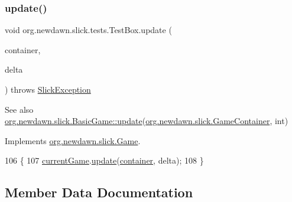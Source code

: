 \subsubsection{\texorpdfstring{update()}{update()}}
{\footnotesize\ttfamily void org.\+newdawn.\+slick.\+tests.\+Test\+Box.\+update (\begin{DoxyParamCaption}\item[{\mbox{\hyperlink{classorg_1_1newdawn_1_1slick_1_1_game_container}{Game\+Container}}}]{container,  }\item[{int}]{delta }\end{DoxyParamCaption}) throws \mbox{\hyperlink{classorg_1_1newdawn_1_1slick_1_1_slick_exception}{Slick\+Exception}}\hspace{0.3cm}{\ttfamily [inline]}}

\begin{DoxySeeAlso}{See also}
\mbox{\hyperlink{classorg_1_1newdawn_1_1slick_1_1_basic_game_acfe6fa05aef83bff1631af91a3e4bd20}{org.\+newdawn.\+slick.\+Basic\+Game\+::update}}(\mbox{\hyperlink{classorg_1_1newdawn_1_1slick_1_1_game_container}{org.\+newdawn.\+slick.\+Game\+Container}}, int) 
\end{DoxySeeAlso}


Implements \mbox{\hyperlink{interfaceorg_1_1newdawn_1_1slick_1_1_game_ab07b2e9463ee4631620dde0de25bdee8}{org.\+newdawn.\+slick.\+Game}}.


\begin{DoxyCode}
106                                                                                  \{
107         \mbox{\hyperlink{classorg_1_1newdawn_1_1slick_1_1tests_1_1_test_box_a5e0fdb2f97173d828af597044c525078}{currentGame}}.\mbox{\hyperlink{classorg_1_1newdawn_1_1slick_1_1_basic_game_acfe6fa05aef83bff1631af91a3e4bd20}{update}}(\mbox{\hyperlink{classorg_1_1newdawn_1_1slick_1_1tests_1_1_test_box_a686d64440b8b2323907a6c4641669c60}{container}}, delta);
108     \}
\end{DoxyCode}


\subsection{Member Data Documentation}
\mbox{\label{classorg_1_1newdawn_1_1slick_1_1tests_1_1_test_box_a686d64440b8b2323907a6c4641669c60}} 
